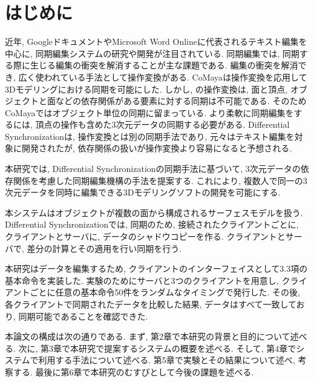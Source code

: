 \chapter{はじめに}
近年, Googleドキュメント\cite{GOOGLEDOCS}やMicrosoft Word Online\cite{WORDONLINE}に代表されるテキスト編集を中心に, 同期編集システムの研究や開発が注目されている.
同期編集では, 同期する際に生じる編集の衝突を解消することが主な課題である.
編集の衝突を解消でき, 広く使われている手法として操作変換がある.
CoMaya\cite{COMAYA}は操作変換を応用して3Dモデリングにおける同期を可能にした.
しかし, \cite{COMAYA}の操作変換は, 面と頂点, オブジェクトと面などの依存関係がある要素に対する同期は不可能である.
そのためCoMayaではオブジェクト単位の同期に留まっている.
より柔軟に同期編集をするには, 頂点の操作も含めた3次元データの同期する必要がある.
Differential Synchronization\cite{DS}は, 操作変換とは別の同期手法であり, 元々はテキスト編集を対象に開発されたが, 依存関係の扱いが操作変換より容易になると予想される.
\par
本研究では, Differential Synchronizationの同期手法に基づいて, 3次元データの依存関係を考慮した同期編集機構の手法を提案する.
これにより, 複数人で同一の3次元データを同時に編集できる3Dモデリングソフトの開発を可能にする.
\par
本システムはオブジェクトが複数の面から構成されるサーフェスモデルを扱う. Differential Synchronizationでは, 同期のため, 接続されたクライアントごとに, クライアントとサーバに, データのシャドウコピーを作る. クライアントとサーバで, 差分の計算とその適用を行い同期を行う.
\par
本研究はデータを編集するため, クライアントのインターフェイスとして3.3項の基本命令を実装した.
実験のためにサーバと3つのクライアントを用意し, クライアントごとに任意の基本命令50件をランダムなタイミングで発行した.
 その後, 各クライアントで同期されたデータを比較した結果, データはすべて一致しており, 同期可能であることを確認できた.
\par
本論文の構成は次の通りである. まず, 第2章で本研究の背景と目的について述べる. 次に, 第3章で本研究で提案するシステムの概要を述べる. そして, 第4章でシステムで利用する手法について述べる. 第5章で実験とその結果について述べ, 考察する. 最後に第6章で本研究のむすびとして今後の課題を述べる.
